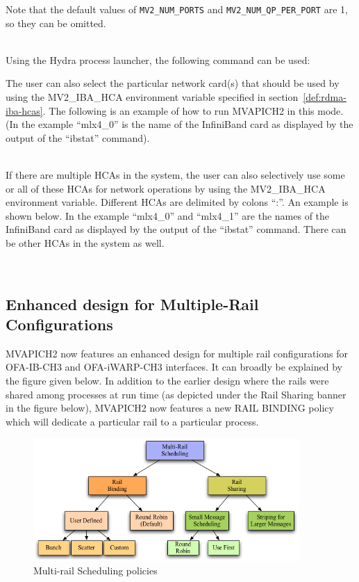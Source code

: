 Note that the default values of \texttt{MV2\_NUM\_PORTS} and
\texttt{MV2\_NUM\_QP\_PER\_PORT} are 1, so they can be omitted.

\\

Using the Hydra process launcher, the following command can be used:\\


The user can also select the particular network card(s) that should be
used by using the MV2\_IBA\_HCA environment variable specified
in section~\ref{def:rdma-iba-hcas}. The following is an example of how to run
MVAPICH2 in this mode. (In the example ``mlx4\_0'' is the name of the
InfiniBand card as displayed by the output of the ``ibstat'' command).

\\

If there are multiple HCAs in the system, the user can also selectively
use some or all of these HCAs for network operations by using the
MV2\_IBA\_HCA environment variable. Different HCAs are delimited by
colons ``:''. An example is shown below. In the example ``mlx4\_0'' and
``mlx4\_1'' are the names of the InfiniBand card as displayed by the
output of the ``ibstat'' command. There can be other HCAs in the system
as well.

\\

\subsection{Enhanced design for Multiple-Rail Configurations}
\label{subsec:mpi-mr_new}
MVAPICH2 now features an enhanced design for multiple rail
configurations for OFA-IB-CH3 and OFA-iWARP-CH3 interfaces. It can
broadly be explained by the figure given below. In addition to the
earlier design where the rails were shared among processes at run time
(as depicted under the Rail Sharing banner in the figure below),
MVAPICH2 now features a new RAIL BINDING policy which will dedicate a
particular rail to a particular process.

\begin{figure}[htbp]
 \centering
 \includegraphics[width=0.9\textwidth]{Img/multi-rail-design.png}
 \caption{Multi-rail Scheduling policies}
 \label{fig:mrail_new}
\end{figure}

